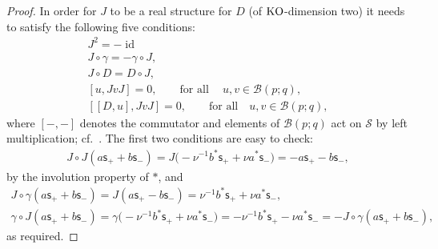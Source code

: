 \documentclass[pdftex]{sigma}
\numberwithin{equation}{section}
\def\Weyl#1#2{{\mathcal{B}}(#1;#2)}
\begin{document}
\begin{proof}
In order for $J$ to be a real structure for $D$ (of ${\rm KO}$-dimension two) it needs to satisfy the following f\/ive conditions:
\begin{subequations}\label{real}
\begin{gather}
J^2 = -\operatorname{id} \label{j2}
\\
J\circ\gamma = - \gamma\circ J, \label{jgamma}
\\
J\circ D = D\circ J, \label{jd}
\\
[u, J vJ] = 0, \qquad \mbox{for all}\ \quad u,v\in \Weyl p q, \label{order-0}
\\
[[D,u], J vJ] = 0, \qquad \mbox{for all} \quad u,v\in \Weyl p q, \label{order-1}
\end{gather}
\end{subequations}
where $[-,-]$ denotes the commutator and elements of $\Weyl p q$ act on $\mathcal{S}$ by left multiplication; cf.~\cite{Con:rea}. The f\/irst two conditions are easy to check:
\begin{gather*}
J\circ J(a{\mathsf{s}}_++b{\mathsf{s}}_-) = J\big({-}\nu^{-1} b^*{\mathsf{s}}_+ + \nu a^*{\mathsf{s}}_-\big) = - a {\mathsf{s}}_+-b{\mathsf{s}}_-,
\end{gather*}
by the involution property of $*$, and
\begin{gather*}
J\circ \gamma (a{\mathsf{s}}_++b{\mathsf{s}}_-) = J(a{\mathsf{s}}_+-b{\mathsf{s}}_-) =\nu^{-1} b^*{\mathsf{s}}_+ + \nu a^*{\mathsf{s}}_-,
\\
\gamma\circ J (a{\mathsf{s}}_++b{\mathsf{s}}_-) = \gamma\big({-}\nu^{-1} b^*{\mathsf{s}}_+ + \nu a^*{\mathsf{s}}_-\big) = -\nu^{-1} b^*{\mathsf{s}}_+ - \nu a^*{\mathsf{s}}_- = -J\circ \gamma (a {\mathsf{s}}_++b{\mathsf{s}}_-) ,
\end{gather*}
as required.


\end{proof}
\end{document}
